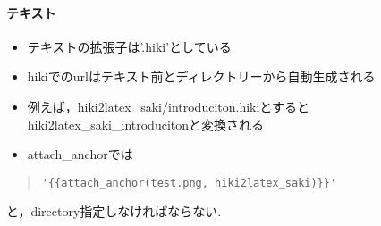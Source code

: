 \paragraph{テキスト}
\begin{itemize}
\item テキストの拡張子は'.hiki'としている
\item hikiでのurlはテキスト前とディレクトリーから自動生成される
\item 例えば，hiki2latex\_saki/introduciton.hikiとするとhiki2latex\_saki\_introducitonと変換される
\item attach\_anchorでは
\end{itemize}\begin{quote}\begin{verbatim}
'{{attach_anchor(test.png, hiki2latex_saki)}}'
\end{verbatim}\end{quote}
と，directory指定しなければならない.

